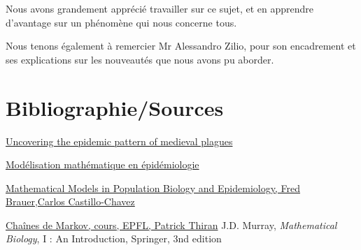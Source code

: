 \documentclass[a4paper]{article}
\theoremstyle{plain}
\theoremstyle{definition}
\theoremstyle{remark}
\begin{document}
Nous avons grandement apprécié travailler sur ce sujet, et en apprendre d'avantage sur un phénomène qui nous concerne tous.

Nous tenons également à remercier Mr Alessandro Zilio, pour son encadrement et ses explications sur les nouveautés que nous avons pu aborder. 
\newpage
\section{Bibliographie/Sources}

\href{http://www.fields.utoronto.ca/video-archive/static/2018/03/2365-18260/mergedvideo.ogv}{Uncovering the epidemic pattern of medieval plagues}

\href{http://marcchoisy.free.fr/pdf/DeBoeck2010.pdf}{Modélisation mathématique en épidémiologie}

\href{https://link-springer-com.rproxy.sc.univ-paris-diderot.fr/content/pdf/10.1007%2F978-1-4757-3516-1.pdf?fbclid=IwAR21g7kvo-btJQpJCJuV5iVIisr7WpWtXjJ77LII1XvINunnGlIuqqYSDT8}{Mathematical Models in Population Biology and Epidemiology, Fred Brauer,Carlos Castillo-Chavez}

\href{https://docplayer.fr/365545-Module-7-chaines-de-markov-a-temps-continu.html}{Chaînes de Markov, cours, EPFL, Patrick Thiran}
\bibitem{}
    J.D. Murray,
  \textit{Mathematical Biology},
  I : An Introduction, Springer,
  3nd edition
\end{document}
